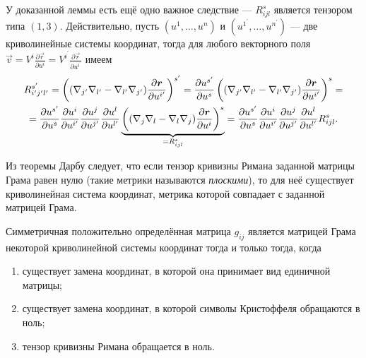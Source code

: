 У доказанной леммы есть ещё одно важное следствие --- $R^s_{ijl}$ является тензором типа $(1, 3)$. Действительно, пусть $(u^1, \ldots, u^n)$ и $(u^{1^\prime}, \ldots, u^{n^\prime})$ --- две криволинейные системы координат\footnotemark{}, тогда для любого векторного поля $\vec{v} = V^i\frac{\partial\vec{r}}{\partial u^i} = V^{i^\prime}\frac{\partial\vec{r}}{\partial u^{i^\prime}}$ имеем
\begin{multline*}
	R^{s^\prime}_{i^\prime j^\prime l^\prime} = \left((\nabla_{j^\prime}\nabla_{l^\prime} - \nabla_{l^\prime}\nabla_{j^\prime})\frac{\partial\boldsymbol{r}}{\partial u^{i^{\prime}}}\right)^{s^\prime} = \frac{\partial u^{s^\prime}}{\partial u^s}\left((\nabla_{j^\prime}\nabla_{l^\prime} - \nabla_{l^\prime}\nabla_{j^\prime})\frac{\partial\boldsymbol{r}}{\partial u^{i^\prime}}\right)^s =\\ = \frac{\partial u^{s^\prime}}{\partial u^s}\frac{\partial u^i}{\partial u^{i^\prime}}\frac{\partial u^j}{\partial u^{j^\prime}}\frac{\partial u^l}{\partial u^{l^\prime}}\underbrace{\left((\nabla_j\nabla_l - \nabla_l\nabla_j)\frac{\partial\boldsymbol{r}}{\partial u^i}\right)^s}_{=R^s_{ijl}} = \frac{\partial u^{s^\prime}}{\partial u^s}\frac{\partial u^i}{\partial u^{i^\prime}}\frac{\partial u^j}{\partial u^{j^\prime}}\frac{\partial u^l}{\partial u^{l^\prime}}R^s_{ijl}.
\end{multline*}


Из теоремы Дарбу следует, что если тензор кривизны Римана заданной матрицы Грама равен нулю (такие метрики называются \textit{плоскими}), то для неё существует криволинейная система координат, метрика которой совпадает с заданной матрицей Грама.

\begin{theorem}
	Симметричная положительно определённая матрица $g_{ij}$ является матрицей Грама некоторой криволинейной системы координат тогда и только тогда, когда
	\begin{enumerate}[nolistsep, label=(\arabic*)]
		\item существует замена координат, в которой она принимает вид единичной матрицы;
		\item существует замена координат, в которой символы Кристоффеля обращаются в ноль;
		\item тензор кривизны Римана обращается в ноль.
	\end{enumerate}
\end{theorem}

